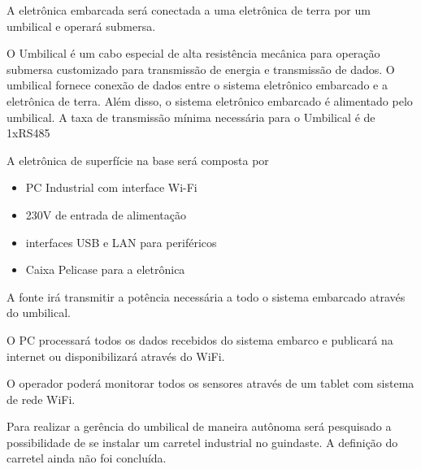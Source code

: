 A eletrônica embarcada será conectada a uma eletrônica de terra por um umbilical e operará submersa. 

O Umbilical é um cabo especial  de alta resistência mecânica para operação submersa customizado para transmissão de energia e transmissão de dados. O umbilical fornece conexão de dados entre o sistema eletrônico embarcado e a eletrônica de terra. Além disso, o sistema eletrônico embarcado é alimentado pelo umbilical. A taxa de transmissão mínima necessária para o Umbilical é de 1xRS485 

A eletrônica de superfície na base será composta por

\begin{itemize}
	\item PC Industrial com interface Wi-Fi
	\item 230V de entrada de alimentação 
	\item interfaces USB e LAN para periféricos 
	\item Caixa Pelicase para a eletrônica
\end{itemize}

A fonte irá transmitir a potência necessária a todo o sistema embarcado
através do umbilical.

O PC processará todos os dados recebidos do sistema embarco e publicará na
internet ou disponibilizará através do WiFi.

O operador poderá monitorar todos os sensores através de um tablet com sistema
de rede WiFi. 

Para realizar a gerência do umbilical de maneira autônoma será pesquisado a possibilidade de se instalar um carretel industrial no guindaste. A definição do carretel ainda não foi concluída. 
 



